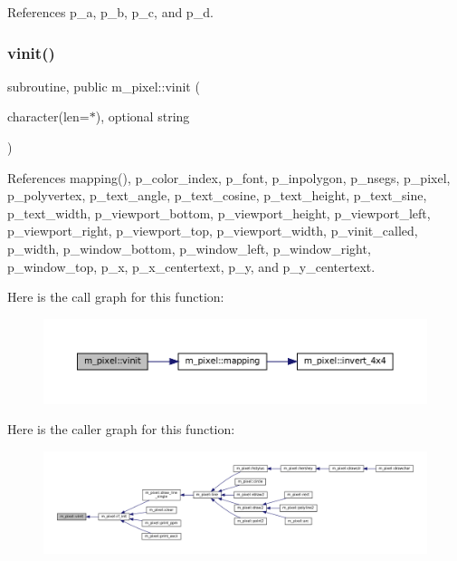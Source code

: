 References p\+\_\+a, p\+\_\+b, p\+\_\+c, and p\+\_\+d.

\mbox{\label{namespacem__pixel_ac03ca8f23fdadb60599b6ea4dc87a6d9}} 
\subsubsection{\texorpdfstring{vinit()}{vinit()}}
{\footnotesize\ttfamily subroutine, public m\+\_\+pixel\+::vinit (\begin{DoxyParamCaption}\item[{character(len=$\ast$), optional}]{string }\end{DoxyParamCaption})}



References mapping(), p\+\_\+color\+\_\+index, p\+\_\+font, p\+\_\+inpolygon, p\+\_\+nsegs, p\+\_\+pixel, p\+\_\+polyvertex, p\+\_\+text\+\_\+angle, p\+\_\+text\+\_\+cosine, p\+\_\+text\+\_\+height, p\+\_\+text\+\_\+sine, p\+\_\+text\+\_\+width, p\+\_\+viewport\+\_\+bottom, p\+\_\+viewport\+\_\+height, p\+\_\+viewport\+\_\+left, p\+\_\+viewport\+\_\+right, p\+\_\+viewport\+\_\+top, p\+\_\+viewport\+\_\+width, p\+\_\+vinit\+\_\+called, p\+\_\+width, p\+\_\+window\+\_\+bottom, p\+\_\+window\+\_\+left, p\+\_\+window\+\_\+right, p\+\_\+window\+\_\+top, p\+\_\+x, p\+\_\+x\+\_\+centertext, p\+\_\+y, and p\+\_\+y\+\_\+centertext.

Here is the call graph for this function\+:
\nopagebreak
\begin{figure}[H]
\begin{center}
\leavevmode
\includegraphics[width=350pt]{namespacem__pixel_ac03ca8f23fdadb60599b6ea4dc87a6d9_cgraph}
\end{center}
\end{figure}
Here is the caller graph for this function\+:
\nopagebreak
\begin{figure}[H]
\begin{center}
\leavevmode
\includegraphics[width=350pt]{namespacem__pixel_ac03ca8f23fdadb60599b6ea4dc87a6d9_icgraph}
\end{center}
\end{figure}
\mbox{\label{namespacem__pixel_a9d4aea8ae2eb15317b83fa03a11371b2}} 
